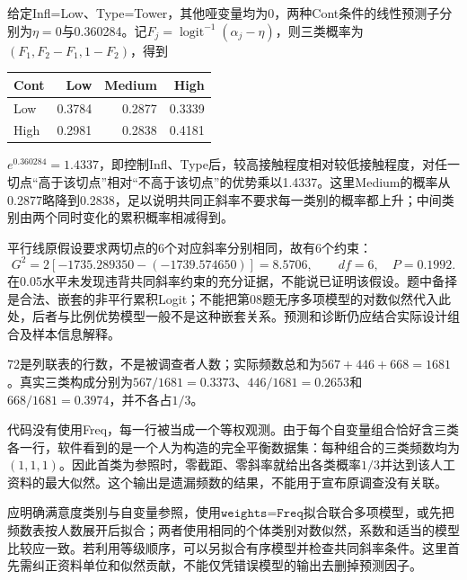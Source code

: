 给定Infl=Low、Type=Tower，其他哑变量均为0，两种Cont条件的线性预测子分别为$\eta=0$与0.360284。记$F_j=\operatorname{logit}^{-1}(\alpha_j-\eta)$，则三类概率为$(F_1,F_2-F_1,1-F_2)$，得到\begin{center}\begin{tabular}{lrrr}\toprule Cont&Low&Medium&High\\\midrule Low&0.3784&0.2877&0.3339\\High&0.2981&0.2838&0.4181\\\bottomrule \end{tabular}\end{center}$e^{0.360284}=1.4337$，即控制Infl、Type后，较高接触程度相对较低接触程度，对任一切点“高于该切点”相对“不高于该切点”的优势乘以1.4337。这里Medium的概率从0.2877略降到0.2838，足以说明共同正斜率不要求每一类别的概率都上升；中间类别由两个同时变化的累积概率相减得到。\par 平行线原假设要求两切点的6个对应斜率分别相同，故有6个约束：\[G^2=2[-1735.289350-(-1739.574650)]=8.5706,\qquad df=6,\quad P=0.1992.\]在0.05水平未发现违背共同斜率约束的充分证据，不能说已证明该假设。题中备择是合法、嵌套的非平行累积Logit；不能把第08题无序多项模型的对数似然代入此处，后者与比例优势模型一般不是这种嵌套关系。预测和诊断仍应结合实际设计组合及样本信息解释。
\par\nobreak\smallskip{}

72是列联表的行数，不是被调查者人数；实际频数总和为$567+446+668=1681$。真实三类构成分别为$567/1681=0.3373$、$446/1681=0.2653$和$668/1681=0.3974$，并不各占$1/3$。\par 代码没有使用Freq，每一行被当成一个等权观测。由于每个自变量组合恰好含三类各一行，软件看到的是一个人为构造的完全平衡数据集：每种组合的三类频数均为$(1,1,1)$。因此首类为参照时，零截距、零斜率就给出各类概率$1/3$并达到该人工资料的最大似然。这个输出是遗漏频数的结果，不能用于宣布原调查没有关联。\par 应明确满意度类别与自变量参照，使用$\texttt{weights=Freq}$拟合联合多项模型，或先把频数表按人数展开后拟合；两者使用相同的个体类别对数似然，系数和适当的模型比较应一致。若利用等级顺序，可以另拟合有序模型并检查共同斜率条件。这里首先需纠正资料单位和似然贡献，不能仅凭错误模型的输出去删掉预测因子。
\par\nobreak\smallskip{}
